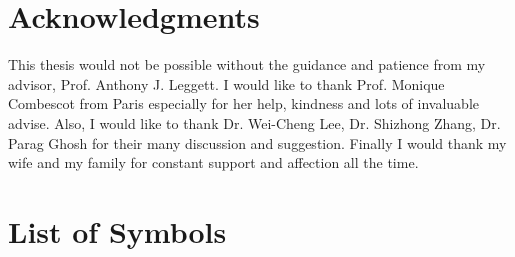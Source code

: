 \documentclass[edeposit,fullpage]{uiucthesis2009}
\begin{document}
\chapter*{Acknowledgments}
This thesis would not be possible without the guidance and patience from my advisor, Prof. Anthony J. Leggett.  I would like to thank Prof. Monique Combescot from Paris especially for her help, kindness and lots of invaluable advise.  Also, I would like to thank Dr. Wei-Cheng Lee, Dr. Shizhong Zhang, Dr. Parag Ghosh for their many discussion and suggestion.  Finally I would thank my wife and my family for constant support and affection all the time.  


\tableofcontents

%

\chapter{List of Symbols}
\end{document}
